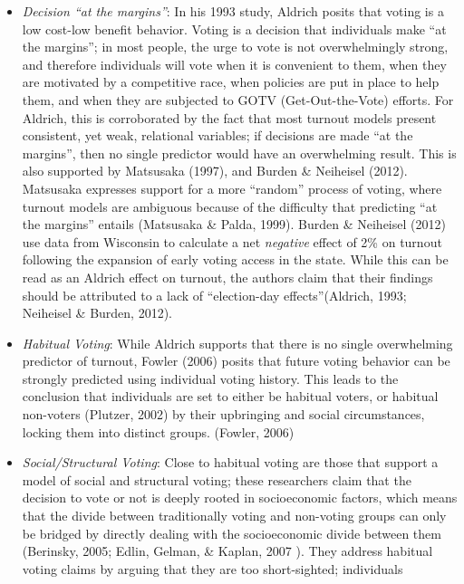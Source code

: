 \documentclass[12pt,twoside]{reedthesis}
\begin{document}
  \begin{itemize}
  \item
    \emph{Decision ``at the margins''}: In his 1993 study, Aldrich posits
    that voting is a low cost-low benefit behavior. Voting is a decision
    that individuals make ``at the margins''; in most people, the urge to
    vote is not overwhelmingly strong, and therefore individuals will vote
    when it is convenient to them, when they are motivated by a
    competitive race, when policies are put in place to help them, and
    when they are subjected to GOTV (Get-Out-the-Vote) efforts. For
    Aldrich, this is corroborated by the fact that most turnout models
    present consistent, yet weak, relational variables; if decisions are
    made ``at the margins'', then no single predictor would have an
    overwhelming result. This is also supported by Matsusaka (1997), and
    Burden \& Neiheisel (2012). Matsusaka expresses support for a more
    ``random'' process of voting, where turnout models are ambiguous
    because of the difficulty that predicting ``at the margins'' entails
    (Matsusaka \& Palda, 1999). Burden \& Neiheisel (2012) use data from
    Wisconsin to calculate a net \emph{negative} effect of 2\% on turnout
    following the expansion of early voting access in the state. While
    this can be read as an Aldrich effect on turnout, the authors claim
    that their findings should be attributed to a lack of ``election-day
    effects''(Aldrich, 1993; Neiheisel \& Burden, 2012).
  \item
    \emph{Habitual Voting}: While Aldrich supports that there is no single
    overwhelming predictor of turnout, Fowler (2006) posits that future
    voting behavior can be strongly predicted using individual voting
    history. This leads to the conclusion that individuals are set to
    either be habitual voters, or habitual non-voters (Plutzer, 2002) by
    their upbringing and social circumstances, locking them into distinct
    groups. (Fowler, 2006)
  \item
    \emph{Social/Structural Voting}: Close to habitual voting are those
    that support a model of social and structural voting; these
    researchers claim that the decision to vote or not is deeply rooted in
    socioeconomic factors, which means that the divide between
    traditionally voting and non-voting groups can only be bridged by
    directly dealing with the socioeconomic divide between them (Berinsky,
    2005; Edlin, Gelman, \& Kaplan, 2007 ). They address habitual voting
    claims by arguing that they are too short-sighted; individuals

\end{itemize}
\end{document}
